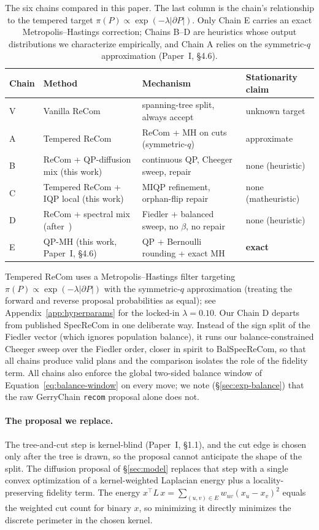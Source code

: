 \documentclass[11pt]{article}
\begin{document}
\begin{table}[htbp]
\centering
\small
\begin{tabular}{llll}
\toprule
Chain & Method & Mechanism & Stationarity claim \\
\midrule
V & Vanilla ReCom~\cite{deford2021recombination} & spanning-tree split, always accept & unknown target \\
A & Tempered ReCom & ReCom + MH on cuts (symmetric-$q$) & approximate \\
B & ReCom + QP-diffusion mix (this work) & continuous QP, Cheeger sweep, repair & none (heuristic) \\
C & Tempered ReCom + IQP local (this work) & MIQP refinement, orphan-flip repair & none (matheuristic) \\
D & ReCom + spectral mix (after~\cite{davies2025spectral}) & Fiedler + balanced sweep, no $\beta$, no repair & none (heuristic) \\
E & QP-MH (this work, Paper~I, \S4.6) & QP + Bernoulli rounding + exact MH & \textbf{exact} \\
\bottomrule
\end{tabular}
\caption{The six chains compared in this paper. The last column is the
  chain's relationship to the tempered target
  $\pi(P) \propto \exp(-\lambda|\partial P|)$. Only Chain E carries an
  exact Metropolis--Hastings correction; Chains B--D are heuristics
  whose output distributions we characterize empirically, and Chain A
  relies on the symmetric-$q$ approximation
  (Paper~I, \S4.6).}
\label{tab:five-chains}
\end{table}

Tempered ReCom uses a Metropolis--Hastings filter targeting
$\pi(P) \propto \exp(-\lambda |\partial P|)$ with the symmetric-$q$
approximation (treating the forward and reverse proposal probabilities
as equal); see Appendix~\ref{app:hyperparams} for the locked-in
$\lambda = 0.10$. Our Chain D departs from published SpecReCom in one
deliberate way. Instead of the sign split of the Fiedler vector (which
ignores population balance), it runs our balance-constrained Cheeger
sweep over the Fiedler order, closer in spirit to BalSpecReCom, so that all chains produce valid plans and the comparison isolates the
role of the fidelity term. All chains also enforce the global
two-sided balance window of Equation~\eqref{eq:balance-window} on
every move; we note (\S\ref{sec:exp-balance}) that the raw GerryChain
\texttt{recom} proposal alone does not.

\paragraph{The proposal we replace.}\label{sec:background-weakness}
The tree-and-cut step is kernel-blind (Paper~I, \S1.1),
and the cut edge is chosen only after the tree is drawn, so the
proposal cannot anticipate the shape of the split. The diffusion
proposal of \S\ref{sec:model} replaces that step with a single convex
optimization of a kernel-weighted Laplacian energy plus a
locality-preserving fidelity term. The energy
$x^\top L\, x = \sum_{(u,v) \in E} w_{uv} (x_u - x_v)^2$ equals the
weighted cut count for binary $x$, so minimizing it directly
minimizes the discrete perimeter in the chosen kernel.
\end{document}
